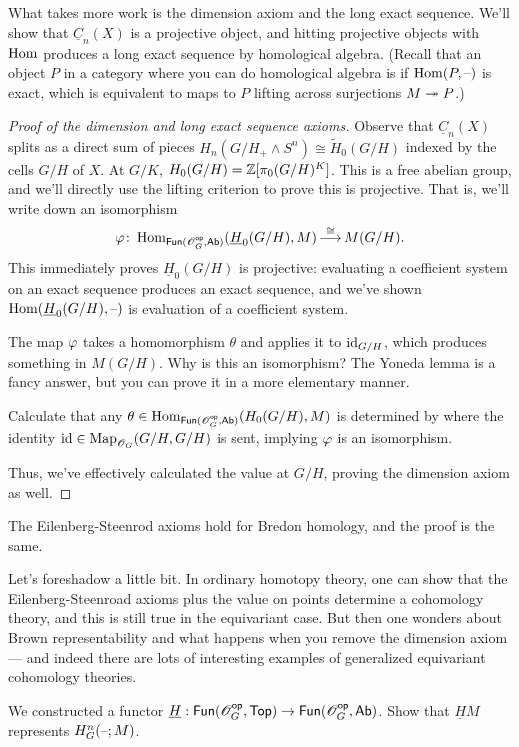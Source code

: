What takes more work is the dimension axiom and the long exact sequence. We'll show that $\underline C_n(X)$ is a
projective object, and hitting projective objects with $\operatorname{Hom}$ produces a long exact sequence by homological
algebra. (Recall that an object $P$ in a category where you can do homological algebra is  if
$\operatorname{Hom}(P,\text{--})$ is exact, which is equivalent to maps to $P$ lifting across surjections $M\twoheadrightarrow P$.)
\begin{proof}[Proof of the dimension and long exact sequence axioms]
Observe that $\underline C_n(X)$ splits as a direct sum of pieces $H_n(G/H_+\wedge S^n)\cong \widetilde H_0(G/H)$
indexed by the cells $G/H$ of $X$. At $G/K$, $H_0(G/H) = \mathbb Z[\pi_0(G/H)^K]$. This is a free abelian group, and
we'll directly use the lifting criterion to prove this is projective. That is, we'll write down an isomorphism
\[\varphi\colon\operatorname{Hom}_{\mathsf{Fun}(\mathscr O_G^{\mathsf{op}}, \mathsf{Ab})}(\underline H_0(G/H), M) \mathop{\longrightarrow}\limits^{\cong} M(G/H).\]
This immediately proves $\underline H_0(G/H)$ is projective: evaluating a coefficient system on an exact sequence
produces an exact sequence, and we've shown $\operatorname{Hom}(\underline H_0(G/H), \text{--})$ is evaluation of a coefficient system.

The map $\varphi$ takes a homomorphism $\theta$ and applies it to $\mathrm{id}_{G/H}$, which produces something in $M(G/H)$.
Why is this an isomorphism? The Yoneda lemma is a fancy answer, but you can prove it in a more elementary manner.
\begin{ex}
Calculate that any $\theta\in\operatorname{Hom}_{\mathsf{Fun}(\mathscr O_G^{\mathsf{op}}, \mathsf{Ab})}(H_0(G/H), M)$ is determined by where the identity
$\mathrm{id}\in\operatorname{Map}_{\mathscr O_G}(G/H, G/H)$ is sent, implying $\varphi$ is an isomorphism.
\end{ex}
Thus, we've effectively calculated the value at $G/H$, proving the dimension axiom as well.
\end{proof}
The Eilenberg-Steenrod axioms hold for Bredon homology, and the proof is the same.
\begin{rem}
Let's foreshadow a little bit. In ordinary homotopy theory, one can show that the Eilenberg-Steenroad axioms
plus the value on points determine a cohomology theory, and this is still true in the equivariant case. But then
one wonders about Brown representability and what happens when you remove the dimension axiom --- and indeed
there are lots of interesting examples of generalized equivariant cohomology theories.
\end{rem}
\begin{ex}
We constructed a functor $\underline H:\mathsf{Fun}(\mathscr O_G^{\mathsf{op}},\mathsf{Top})\to \mathsf{Fun}(\mathscr O_G^{\mathsf{op}}, \mathsf{Ab})$. Show that $\underline HM$
represents $H_G^n(\text{--}; M)$.
\end{ex}

